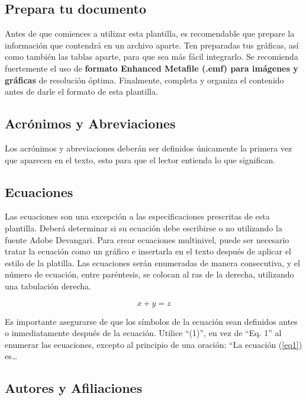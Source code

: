     \subsection{Prepara tu documento}
    
        Antes de que comiences a utilizar esta plantilla, es recomendable que prepare la información que contendrá en un archivo aparte. 
        Ten preparadas tus gráficas, así como también las tablas aparte, para que sea más fácil integrarlo. 
        Se recomienda fuertemente el uso de \textbf{formato Enhanced Metafile (.emf) para imágenes y gráficas} de resolución óptima. 
        Finalmente, completa y organiza el contenido antes de darle el formato de esta plantilla. 
    
        \subsection{Acrónimos y Abreviaciones}
    
        Los acrónimos y abreviaciones deberán ser definidos únicamente la primera vez que aparecen en el texto, esto para que el lector entienda lo que significan.
    
        \subsection{Ecuaciones}
    
        Las ecuaciones son una excepción a las especificaciones prescritas de esta plantilla. 
        Deberá determinar si su ecuación debe escribirse o no utilizando la fuente Adobe Devangari. 
        Para crear ecuaciones multinivel, puede ser necesario tratar la ecuación como un gráfico e insertarla en el texto después de aplicar el estilo de la platilla.
        Las ecuaciones serán enumeradas de manera consecutiva, y el número de ecuación, entre paréntesis, se colocan al ras de la derecha, utilizando una tabulación derecha. 
    
        \begin{equation}
            \label{eq1}
            x + y = z 
        \end{equation}
    
        Es importante asegurarse de que los símbolos de la ecuación sean definidos antes o inmediatamente después de la ecuación. Utilice “(1)”, en vez de “Eq. 1” al enumerar las ecuaciones, excepto al principio de una oración: “La ecuación (\ref{eq1}) es…
    
        \subsection{Autores y Afiliaciones}
    
